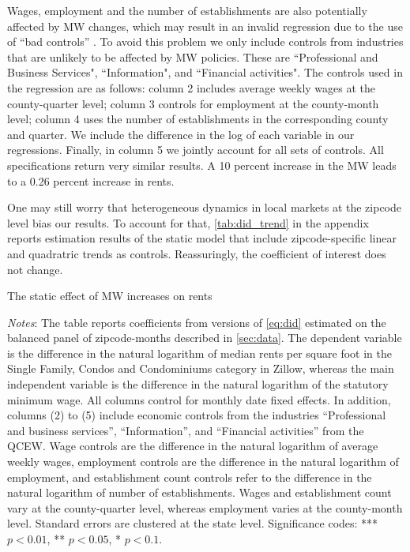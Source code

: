 Wages, employment and the number of establishments are also potentially affected by MW changes,
which may result in an invalid regression due to the use of ``bad controls'' 
\parencite{AngristPischke2009}. To avoid this problem we only include controls from industries 
that are unlikely to be affected by MW policies. These are ``Professional and Business Services", 
``Information", and ``Financial activities". The controls used in the regression are as follows:
column 2 includes average weekly wages at the county-quarter level; column 3 controls for 
employment at the county-month level; column 4 uses the number of establishments in the 
corresponding county and quarter. We include the difference in the log of each variable in our
regressions. Finally, in column 5 we jointly account for all sets of controls. All specifications 
return very similar results. A 10 percent increase in the MW leads to a 0.26 percent increase 
in rents. 

One may still worry that heterogeneous dynamics in local markets at the zipcode level bias our 
results. To account for that, \autoref{tab:did_trend} in the appendix reports estimation 
results of the static model that include zipcode-specific linear and quadratric trends as controls. 
Reassuringly, the coefficient of interest does not change.

\begin{table}[h!]
    \caption{The static effect of MW increases on rents}
    \label{tab:did_main}
    \centering
    
    \begin{minipage}{0.9\textwidth} \footnotesize
		\vspace{3mm} 
		\textit{Notes}: The table reports coefficients from versions of \autoref{eq:did} 
		estimated on the balanced panel of zipcode-months described in \autoref{sec:data}. 
		The dependent variable is the difference in the natural logarithm of median	rents 
		per square foot in the Single Family, Condos and Condominiums category in Zillow, 
		whereas the main independent variable is the difference in the natural logarithm of 
		the statutory minimum wage. All columns control for monthly date fixed effects. In 
		addition, columns (2) to (5) include economic controls from the industries 
		``Professional and business services'', ``Information'', and ``Financial activities'' 
		from the QCEW. Wage controls are the difference in the natural logarithm of average 
		weekly wages, employment controls are the difference in the natural logarithm of 
		employment, and establishment count controls refer to the difference in the natural 
		logarithm of number of establishments. Wages and establishment count vary at the 
		county-quarter level, whereas employment varies at the county-month level. Standard 
		errors are clustered at the state level. Significance codes: *** $p < 0.01$, ** 
		$p < 0.05$, * $p < 0.1$.
	\end{minipage}
\end{table}

